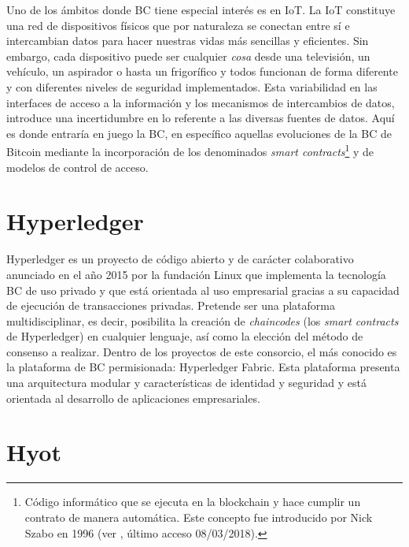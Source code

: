 \documentclass[10pt,conference,a4paper]{IEEEtran}
\begin{document}
Uno de los ámbitos donde BC tiene especial interés es en IoT. La IoT
constituye una red de dispositivos físicos que por naturaleza se
conectan entre sí e intercambian datos para hacer nuestras vidas más
sencillas y eficientes. Sin embargo, cada dispositivo puede ser
cualquier \textit{cosa} desde una televisión, un vehículo, un
aspirador o hasta un frigorífico y todos funcionan de forma diferente
y con diferentes niveles de seguridad implementados. Esta variabilidad
en las interfaces de acceso a la información y los mecanismos de
intercambios de datos, introduce una incertidumbre en lo referente a
las diversas fuentes de datos. Aquí es donde entraría en juego la BC,
en específico aquellas evoluciones de la BC de Bitcoin mediante la
incorporación de los denominados \emph{smart
  contracts}\footnote{Código informático que se ejecuta en la
  blockchain y hace cumplir un contrato de manera automática. Este
  concepto fue introducido por Nick Szabo en 1996 (ver \cite{szabo:1997:FSRPN},
  último acceso 08/03/2018).} y
de modelos de control de acceso.

\section{Hyperledger}

Hyperledger es un proyecto de código abierto y de carácter
colaborativo anunciado en el año 2015 por la fundación Linux que
implementa la tecnología BC de uso privado y que está orientada al uso
empresarial gracias a su capacidad de ejecución de transacciones
privadas. Pretende ser una plataforma multidisciplinar, es decir,
posibilita la creación de \textit{chaincodes} (los \textit{smart
  contracts} de Hyperledger) en cualquier lenguaje, así como la
elección del método de consenso a realizar. Dentro de los proyectos de
este consorcio, el más conocido es la plataforma de BC permisionada:
Hyperledger Fabric. Esta plataforma presenta una arquitectura modular
y características de identidad y seguridad y está orientada al
desarrollo de aplicaciones empresariales.

\section{Hyot}
\end{document}
